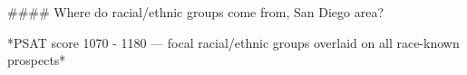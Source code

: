 #### Where do racial/ethnic groups come from, San Diego area?

*PSAT score 1070 - 1180 — focal racial/ethnic groups overlaid on all race-known prospects*
